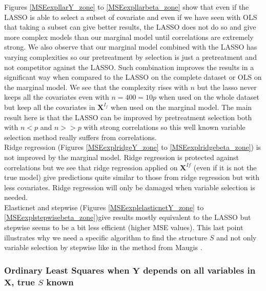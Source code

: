 \documentclass[12pt,a4paper]{report}
\begin{document}
Figures \ref{MSEexpllarY_zone} to \ref{MSEexpllarbeta_zone} show that even if the LASSO is able to select a subset of covariate and even if we have seen with OLS that taking a subset can give better results, the LASSO does not do so and give more complex models than our marginal model until correlations are extremely strong. We also observe that our marginal model combined with the LASSO has varying complexities so our pretreatment by selection is just a pretreatment and not competitor against the LASSO. Such combination improves the results in a significant way when compared to the LASSO on the complete dataset or OLS on the marginal model. We see that the complexity rises with $n$ but the lasso never keeps all the covariates even with $n=400=10p$ when used on the whole dataset but keep all the covariates in $\boldsymbol{X}^{I_f}$ when used on the marginal model. The main result here is that the LASSO can be improved by pretreatment selection both with $n<p$ and $n>>p$ with strong correlations so this well known variable selection method really suffers from correlations. \\

Ridge regression (Figures \ref{MSEexplridgeY_zone} to \ref{MSEexplridgebeta_zone}) is not improved by the marginal model. Ridge regression is protected against correlations but we see that ridge regression applied on $\boldsymbol{X}^{If}$ (even if it is not the true model) give predictions quite similar to those from ridge regression but with less covariates. Ridge regression will only be damaged when variable selection is needed. \\


Elasticnet and stepwise (Figures \ref{MSEexplelasticnetY_zone} to \ref{MSEexplstepwisebeta_zone})give results mostly equivalent to the LASSO but stepwise seems to be a bit less efficient (higher MSE values). This last point illustrates why we need a specific algorithm to find the structure $S$ and not only variable selection by stepwise like in the method from Maugis \cite{maugis2009variable}.

	\FloatBarrier

\newpage
\subsubsection{Ordinary Least Squares when $\boldsymbol{Y}$ depends on all variables in $\boldsymbol{X}$, true $S$ known}
\end{document}
